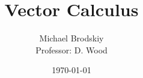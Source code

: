 


\title{Vector Calculus}
\date{\today}
\author{Michael Brodskiy\\ \small Professor: D. Wood}



\maketitle

